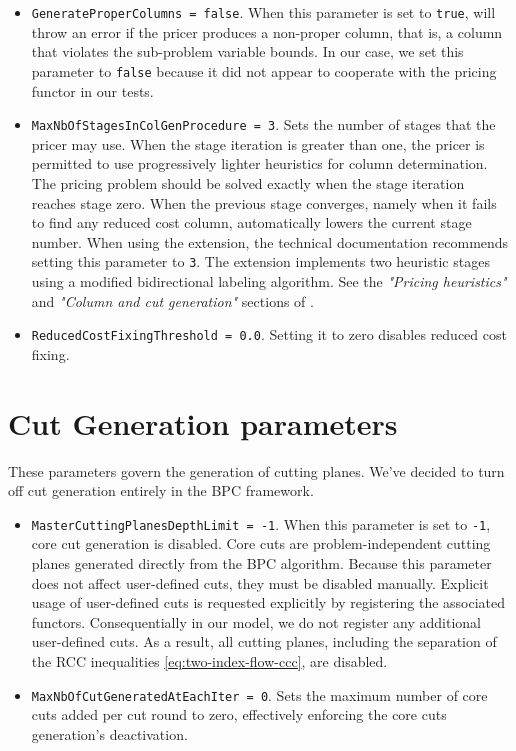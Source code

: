 \begin{itemize}
	\item \texttt{GenerateProperColumns = false}.
	      When this parameter is set to \texttt{true},
	      \bapcod{} will throw an error if the pricer produces a non-proper column,
	      that is, a column that violates the sub-problem variable bounds.
	      In our case, we set this parameter to \texttt{false}
	      because it did not appear to cooperate with the \vrpsolver{} pricing functor in our tests.
	\item \texttt{MaxNbOfStagesInColGenProcedure = 3}.
	      Sets the number of stages that the pricer may use.
	      When the stage iteration is greater than one,
	      the pricer is permitted to use progressively lighter heuristics for column determination.
	      The pricing problem should be solved exactly when the stage iteration reaches stage zero.
	      When the previous stage converges,
	      namely when it fails to find any reduced cost column,
	      \bapcod{} automatically lowers the current stage number.
	      When using the \vrpsolver{} extension,
	      the technical documentation recommends setting this parameter to \texttt{3}.
	      The \vrpsolver{} extension implements two heuristic stages using
	      a modified bidirectional labeling algorithm.
	      See the \textit{"Pricing heuristics"} and \textit{"Column and cut generation"} sections of \textcite{sadykov2021bucket}.
	\item \texttt{ReducedCostFixingThreshold = 0.0}.
	      Setting it to zero disables reduced cost fixing.
\end{itemize}

\section{Cut Generation parameters}
These parameters govern the generation of cutting planes.
We've decided to turn off cut generation entirely in the BPC framework.

\begin{itemize}
	\item \texttt{MasterCuttingPlanesDepthLimit = -1}.
	      When this parameter is set to \texttt{-1}, core cut generation is disabled.
	      Core cuts are problem-independent cutting planes generated directly from the BPC algorithm.
	      Because this parameter does not affect user-defined cuts, they must be disabled manually.
	      Explicit usage of user-defined cuts is requested explicitly
	      by registering the associated functors.
	      Consequentially in our \bapcod{} model, we do not register any additional user-defined cuts.
	      As a result, all cutting planes,
	      including the separation of the RCC inequalities \cref{eq:two-index-flow-ccc},
	      are disabled.
	\item \texttt{MaxNbOfCutGeneratedAtEachIter = 0}.
	      Sets the maximum number of core cuts added per cut round to zero,
	      effectively enforcing the core cuts generation's deactivation.
\end{itemize}

